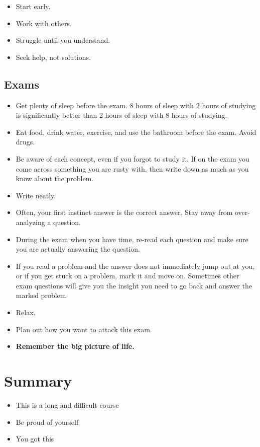 \documentclass[main.tex]{subfiles}
\begin{document}
\begin{itemize} %
	\item Start early.
	\item Work with others.
	\item Struggle until you understand.
	\item Seek help, not solutions.
\end{itemize}

\subsection{Exams}

\begin{itemize} %
	\item Get plenty of sleep before the exam. 8 hours of sleep with 2 hours of studying is significantly better than 2 hours of sleep with 8 hours of studying.
	\item Eat food, drink water, exercise, and use the bathroom before the exam. Avoid drugs.
	\item Be aware of each concept, even if you forgot to study it. If on the exam you come across something you are rusty with, then write down as much as you know about the problem.
	\item Write neatly.
	\item Often, your first instinct answer is the correct answer. Stay away from over-analyzing a question.
	\item During the exam when you have time, re-read each question and make sure you are actually answering the question.
	\item If you read a problem and the answer does not immediately jump out at you, or if you get stuck on a problem, mark it and move on. Sometimes other exam questions will give you the insight you need to go back and answer the marked problem.
	\item Relax.
	\item Plan out how you want to attack this exam. %
	\item \textbf{Remember the big picture of life.}
\end{itemize}

\section{Summary}

\begin{itemize}
	\item This is a long and difficult course
	\item Be proud of yourself
	\item You got this
\end{itemize}
\end{document}
